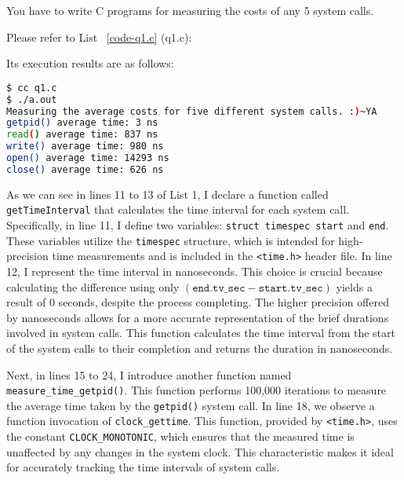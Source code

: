 \documentclass[10pt, answers]{exam}
\begin{document}

\begin{questions} 
\setcounter{question}{0} 

\question 
You have to write C programs for measuring the costs of any 5 system calls.

\begin{solution}
Please refer to List ~\ref{code-q1.c} (q1.c):



Its execution results are as follows:

\begin{lstlisting}[language=bash]
$ cc q1.c
$ ./a.out 
Measuring the average costs for five different system calls. :)~YA
getpid() average time: 3 ns
read() average time: 837 ns
write() average time: 980 ns
open() average time: 14293 ns
close() average time: 626 ns
\end{lstlisting}

As we can see in lines 11 to 13 of List 1, I declare a function called \texttt{getTimeInterval} that calculates the time interval for each system call. Specifically, in line 11, I define two variables: \texttt{struct timespec start} and \texttt{end}. These variables utilize the \texttt{timespec} structure, which is intended for high-precision time measurements and is included in the \texttt{<time.h>} header file. In line 12, I represent the time interval in nanoseconds. This choice is crucial because calculating the difference using only \((\texttt{end.tv\_sec} - \texttt{start.tv\_sec})\) yields a result of 0 seconds, despite the process completing. The higher precision offered by nanoseconds allows for a more accurate representation of the brief durations involved in system calls. This function calculates the time interval from the start of the system calls to their completion and returns the duration in nanoseconds.

Next, in lines 15 to 24, I introduce another function named \texttt{measure\_time\_getpid()}. This function performs 100,000 iterations to measure the average time taken by the \texttt{getpid()} system call. In line 18, we observe a function invocation of \texttt{clock\_gettime}. This function, provided by \texttt{<time.h>}, uses the constant \texttt{CLOCK\_MONOTONIC}, which ensures that the measured time is unaffected by any changes in the system clock. This characteristic makes it ideal for accurately tracking the time intervals of system calls.


\end{solution}
\end{questions}
\end{document}
